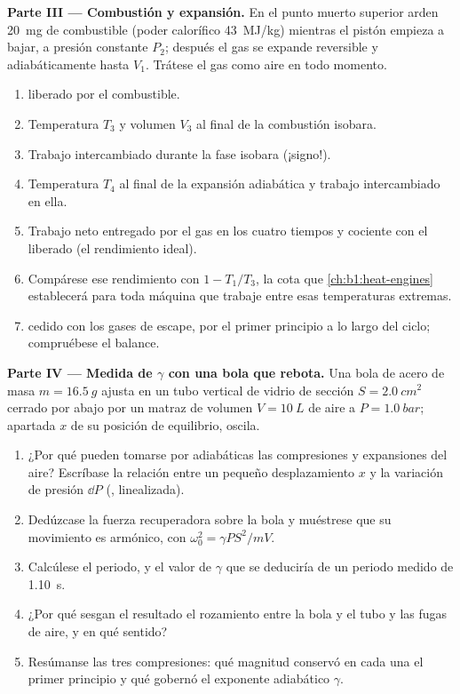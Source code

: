 \begin{problem}
\medskip
\noindent\textbf{Parte III --- Combustión y expansión.}
En el punto muerto superior arden \qty{20}{mg} de combustible (poder
calorífico \qty{43}{MJ/kg}) mientras el pistón empieza a bajar, a presión
constante $P_2$; después el gas se expande reversible y adiabáticamente
hasta $V_1$. Trátese el gas como aire en todo momento.
\begin{enumerate}[resume]
  \item {} liberado por el combustible.
  \item Temperatura $T_3$ y volumen $V_3$ al final de la combustión
        isobara.
  \item Trabajo intercambiado durante la fase isobara (¡signo!).
  \item Temperatura $T_4$ al final de la expansión adiabática y trabajo
        intercambiado en ella.
  \item Trabajo neto entregado por el gas en los cuatro tiempos y cociente
        con el  liberado (el rendimiento ideal).
  \item Compárese ese rendimiento con $1 - T_1/T_3$, la cota que
        \cref{ch:b1:heat-engines} establecerá para toda máquina que trabaje
        entre esas temperaturas extremas.
  \item {} cedido con los gases de escape, por el primer principio a lo
        largo del ciclo; compruébese el balance.
\end{enumerate}

\medskip
\noindent\textbf{Parte IV --- Medida de $\gamma$ con una bola que rebota.}
Una bola de acero de masa $m = \qty{16.5}{g}$ ajusta en un tubo vertical de
vidrio de sección $S = \qty{2.0}{cm^2}$ cerrado por abajo por un matraz de
volumen $V = \qty{10}{L}$ de aire a $P = \qty{1.0}{bar}$; apartada $x$
de su posición de equilibrio, oscila.
\begin{enumerate}[resume]
  \item ¿Por qué pueden tomarse por adiabáticas las compresiones y
        expansiones del aire? Escríbase la relación entre un pequeño
        desplazamiento $x$ y la variación de presión $\dd P$ (, linealizada).
  \item Dedúzcase la fuerza recuperadora sobre la bola y muéstrese que su
        movimiento es armónico, con $\omega_0^2 = \gamma PS^2/mV$.
  \item Calcúlese el periodo, y el valor de $\gamma$ que se deduciría de un
        periodo medido de \qty{1.10}{s}.
  \item ¿Por qué sesgan el resultado el rozamiento entre la bola y el tubo
        y las fugas de aire, y en qué sentido?
  \item Resúmanse las tres compresiones: qué magnitud conservó en cada una
        el primer principio y qué gobernó el exponente adiabático $\gamma$.
\end{enumerate}
\end{problem}
